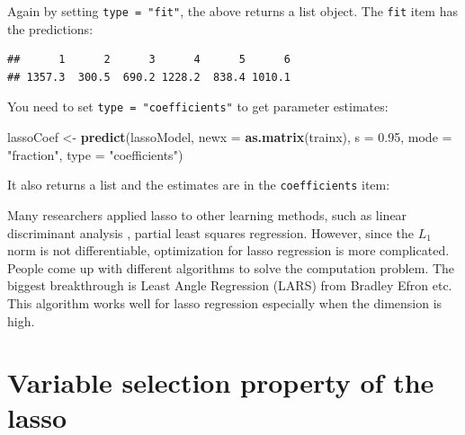 \documentclass[12pt,]{krantz}
\makeatletter
\newenvironment{Shaded}{\begin{snugshade}}{\end{snugshade}}
\newcommand{\CommentTok}[1]{\textcolor[rgb]{0.37,0.37,0.37}{\textit{#1}}}
\newcommand{\DataTypeTok}[1]{\textcolor[rgb]{0.27,0.27,0.27}{#1}}
\newcommand{\FloatTok}[1]{\textcolor[rgb]{0.06,0.06,0.06}{#1}}
\newcommand{\KeywordTok}[1]{\textcolor[rgb]{0.27,0.27,0.27}{\textbf{#1}}}
\newcommand{\NormalTok}[1]{#1}
\newcommand{\OperatorTok}[1]{\textcolor[rgb]{0.43,0.43,0.43}{\textbf{#1}}}
\newcommand{\StringTok}[1]{\textcolor[rgb]{0.5,0.5,0.5}{#1}}
\newenvironment{kframe}{%
\medskip{}
\setlength{\fboxsep}{.8em}
 \def\at@end@of@kframe{}%
 \ifinner\ifhmode%
  \def\at@end@of@kframe{\end{minipage}}%
  \begin{minipage}{\columnwidth}%
 \fi\fi%
 \def\FrameCommand##1{\hskip\@totalleftmargin \hskip-\fboxsep
 \colorbox{shadecolor}{##1}\hskip-\fboxsep
     \hskip-\linewidth \hskip-\@totalleftmargin \hskip\columnwidth}%
 \MakeFramed {\advance\hsize-\width
   \@totalleftmargin\z@ \linewidth\hsize
   \@setminipage}}%
 {\par\unskip\endMakeFramed%
 \at@end@of@kframe}
\renewenvironment{Shaded}{\begin{kframe}}{\end{kframe}}
\makeatother
\begin{document}
Again by setting \texttt{type\ =\ "fit"}, the above returns a list object. The \texttt{fit} item has the predictions:

\begin{Shaded}
\end{Shaded}

\begin{verbatim}
##      1      2      3      4      5      6 
## 1357.3  300.5  690.2 1228.2  838.4 1010.1
\end{verbatim}

You need to set \texttt{type\ =\ "coefficients"} to get parameter estimates:

\begin{Shaded}
\begin{Highlighting}[]
\NormalTok{lassoCoef <-}\StringTok{ }\KeywordTok{predict}\NormalTok{(lassoModel, }\DataTypeTok{newx =} \KeywordTok{as.matrix}\NormalTok{(trainx), }
                     \DataTypeTok{s =} \FloatTok{0.95}\NormalTok{, }\DataTypeTok{mode =} \StringTok{"fraction"}\NormalTok{, }\DataTypeTok{type =} \StringTok{"coefficients"}\NormalTok{)}
\end{Highlighting}
\end{Shaded}

It also returns a list and the estimates are in the \texttt{coefficients} item:

\begin{Shaded}
\end{Shaded}

Many researchers applied lasso to other learning methods, such as linear discriminant analysis \citep{Clem2011}, partial least squares regression\citep{chun2010}. However, since the \(L_1\) norm is not differentiable, optimization for lasso regression is more complicated. People come up with different algorithms to solve the computation problem. The biggest breakthrough is Least Angle Regression (LARS) from Bradley Efron etc. This algorithm works well for lasso regression especially when the dimension is high.

\hypertarget{variable-selection-property-of-the-lasso}{%
\section{Variable selection property of the lasso}\label{variable-selection-property-of-the-lasso}}
\end{document}
